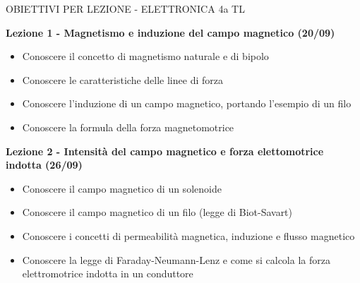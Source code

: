 \documentclass{article}
\begin{document}
	\begin{center}
		\begin{huge}
			OBIETTIVI PER LEZIONE - ELETTRONICA 4a TL
		\end{huge}
	\end{center}

	\begin{center}
	\end{center}

	\begin{center}
		\textbf{Lezione 1 - Magnetismo e induzione del campo magnetico (20/09)}
	\end{center}
	\begin{itemize}
		\item Conoscere il concetto di magnetismo naturale e di bipolo
		\item Conoscere le caratteristiche delle linee di forza
		\item Conoscere l'induzione di un campo magnetico, portando l'esempio di un filo
		\item Conoscere la formula della forza magnetomotrice
	\end{itemize}

	\begin{center}
		\textbf{Lezione 2 - Intensità del campo magnetico e forza elettomotrice indotta (26/09)}
		\begin{itemize}
			\item Conoscere il campo magnetico di un solenoide
			\item Conoscere il campo magnetico di un filo (legge di Biot-Savart)
			\item Conoscere i concetti di permeabilità magnetica, induzione e flusso magnetico
			\item Conoscere la legge di Faraday-Neumann-Lenz e come si calcola la forza elettromotrice indotta in un conduttore
		\end{itemize}
	\end{center}
\end{document}
